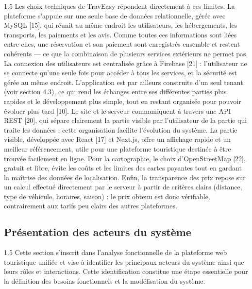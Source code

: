 \documentclass[a4paper,12pt]{report}
\begin{document}
\begin{spacing}{1.5}
Les choix techniques de TravEasy répondent directement à ces limites. La plateforme s'appuie sur une seule base de données relationnelle, gérée avec MySQL [15], qui réunit au même endroit les utilisateurs, les hébergements, les transports, les paiements et les avis. Comme toutes ces informations sont liées entre elles, une réservation et son paiement sont enregistrés ensemble et restent cohérents — ce que la combinaison de plusieurs services extérieurs ne permet pas.
La connexion des utilisateurs est centralisée grâce à Firebase [21] : l'utilisateur ne se connecte qu'une seule fois pour accéder à tous les services, et la sécurité est gérée au même endroit. L'application est par ailleurs construite d'un seul tenant (voir section 4.3), ce qui rend les échanges entre ses différentes parties plus rapides et le développement plus simple, tout en restant organisée pour pouvoir évoluer plus tard [10].
Le site et le serveur communiquent à travers une API REST [20], qui sépare clairement la partie visible par l'utilisateur de la partie qui traite les données ; cette organisation facilite l'évolution du système. La partie visible, développée avec React [17] et Next.js, offre un affichage rapide et un meilleur référencement, utile pour une plateforme touristique destinée à être trouvée facilement en ligne.
Pour la cartographie, le choix d'OpenStreetMap [22], gratuit et libre, évite les coûts et les limites des cartes payantes tout en gardant la maîtrise des données de localisation. Enfin, la transparence des prix repose sur un calcul effectué directement par le serveur à partir de critères clairs (distance, type de véhicule, horaires, saison) : le prix obtenu est donc vérifiable, contrairement aux tarifs peu clairs des autres plateformes.


\subsection{Présentation des acteurs du système}
\vspace{0.5cm}
\begin{spacing}{1.5}
\justifying
Cette section s'inscrit dans l'analyse fonctionnelle de la plateforme web touristique unifiée et vise à identifier les principaux acteurs du système ainsi que leurs rôles et interactions. Cette identification constitue une étape essentielle pour la définition des besoins fonctionnels et la modélisation du système.


\end{spacing}
\end{spacing}
\end{document}
